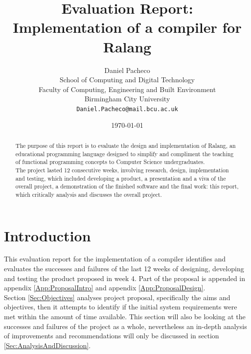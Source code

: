 \documentclass[a4paper]{article}
\begin{document}
	\title{Evaluation Report:\\Implementation of a compiler for Ralang}
	\author{Daniel Pacheco\\
		School of Computing and Digital Technology\\
		Faculty of Computing, Engineering and Built Environment\\
		Birmingham City University\\
		\texttt{Daniel.Pacheco@mail.bcu.ac.uk}}
	\date{\today}
	\maketitle
	\newpage
	\tableofcontents
	\newpage
	\listoftables
	\listoffigures
	\lstlistoflistings
	\newpage
	\setcounter{page}{1}
	\vspace*{\fill}
	\begin{abstract}
		The purpose of this report is to evaluate the design and implementation of Ralang, an educational programming language designed to simplify and compliment the teaching of functional programming concepts to Computer Science undergraduates.\\
		
		The project lasted 12 consecutive weeks, involving research, design, implementation and testing, which included developing a product, a presentation and a viva of the overall project, a demonstration of the finished software and the final work: this report, which critically analysis and discusses the overall project.
	\end{abstract}
	\vspace*{\fill}
	\newpage
	\section{Introduction}
	\label{Sec:Intro}
	This evaluation report for the implementation of a compiler identifies and evaluates the successes and failures of the last 12 weeks of designing, developing and testing the product proposed in week 4. Part of the proposal is appended in appendix \ref{App:ProposalIntro} and appendix \ref{App:ProposalDesign}.\\
	
	Section \ref{Sec:Objectives} analyses project proposal, specifically the aims and objectives, then it attempts to identify if the initial system requirements were met within the amount of time available. This section will also be looking at the successes and failures of the project as a whole, nevertheless an in-depth analysis of  improvements and recommendations will only be discussed in section \ref{Sec:AnalysisAndDiscussion}.\\
	
\end{document}
